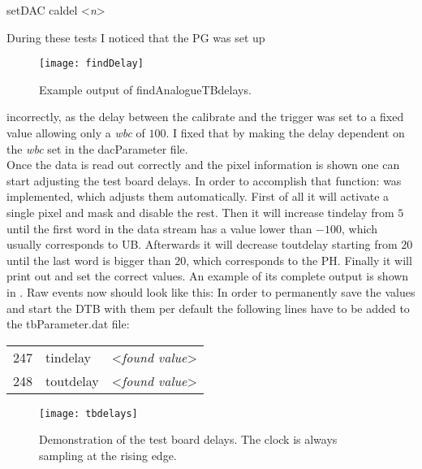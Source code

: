 \begin{itemize}
	\tri \ubuntu setDAC caldel <\textit{n}>
\end{itemize}\no\par
During these tests I noticed that the \ac{PG} was set up 
\begin{wrapfigure}{r}{4cm}
	\vspace*{-10pt}
	\texttt{[image: findDelay]}
	\caption{Example output of findAnalogueTBdelays.}
	\label{pfinddel}
	\vspace*{-5pt}
\end{wrapfigure} 
incorrectly, as the delay between the calibrate and the trigger was set to a fixed value allowing only a  \textit{wbc} of $100$. I fixed that by making the delay dependent on the \textit{wbc} set in the dacParameter file.\\
Once the data is read out correctly and the pixel information is shown one can start adjusting the test board delays. In order to accomplish that function:
was implemented, which adjusts them automatically. First of all it will activate a single pixel and mask and disable the rest. Then it will increase tindelay from $5$ until the first word in the data stream has a value lower than $-100$, which usually corresponds to \ac{UB}. Afterwards it will decrease toutdelay starting from $20$ until the last word is bigger than $20$, which corresponds to the \ac{PH}. Finally it will print out and set the correct values. An example of its complete output is shown in . Raw events now should look like this:
\termi{[-196, 0, 97, -54, 57, 106, 164, 212, 91]} 
In order to permanently save the values and start the \ac{DTB} with them per default the following lines have to be added to the tbParameter.dat file:\s
{\ubuntu
\begin{tabular}{llr}
	247	&   tindelay	&  <\textit{found value}>\\
	248	&	toutdelay	&  <\textit{found value}>
\end{tabular}}\no\s
\begin{figure}[ht]
	\centering
	\texttt{[image: tbdelays]}
	\caption{Demonstration of the test board delays. The clock is always sampling at the rising edge.}
	\label{pdelays}
\end{figure}\no
